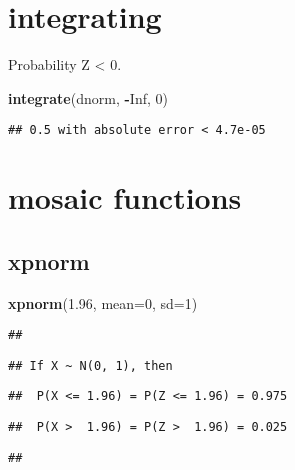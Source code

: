 \documentclass[]{article}
\newenvironment{Shaded}{\begin{snugshade}}{\end{snugshade}}
\newcommand{\KeywordTok}[1]{\textcolor[rgb]{0.13,0.29,0.53}{\textbf{#1}}}
\newcommand{\DataTypeTok}[1]{\textcolor[rgb]{0.13,0.29,0.53}{#1}}
\newcommand{\DecValTok}[1]{\textcolor[rgb]{0.00,0.00,0.81}{#1}}
\newcommand{\FloatTok}[1]{\textcolor[rgb]{0.00,0.00,0.81}{#1}}
\newcommand{\OtherTok}[1]{\textcolor[rgb]{0.56,0.35,0.01}{#1}}
\newcommand{\OperatorTok}[1]{\textcolor[rgb]{0.81,0.36,0.00}{\textbf{#1}}}
\newcommand{\NormalTok}[1]{#1}
\begin{document}
\section{integrating}\label{integrating}

Probability Z \textless{} 0.

\begin{Shaded}
\begin{Highlighting}[]
\KeywordTok{integrate}\NormalTok{(dnorm, }\OperatorTok{-}\OtherTok{Inf}\NormalTok{, }\DecValTok{0}\NormalTok{)}
\end{Highlighting}
\end{Shaded}

\begin{verbatim}
## 0.5 with absolute error < 4.7e-05
\end{verbatim}

\section{mosaic functions}\label{mosaic-functions}

\subsection{xpnorm}\label{xpnorm}

\begin{Shaded}
\begin{Highlighting}[]
\KeywordTok{xpnorm}\NormalTok{(}\FloatTok{1.96}\NormalTok{, }\DataTypeTok{mean=}\DecValTok{0}\NormalTok{, }\DataTypeTok{sd=}\DecValTok{1}\NormalTok{)}
\end{Highlighting}
\end{Shaded}

\begin{verbatim}
## 
\end{verbatim}

\begin{verbatim}
## If X ~ N(0, 1), then
\end{verbatim}

\begin{verbatim}
##  P(X <= 1.96) = P(Z <= 1.96) = 0.975
\end{verbatim}

\begin{verbatim}
##  P(X >  1.96) = P(Z >  1.96) = 0.025
\end{verbatim}

\begin{verbatim}
## 
\end{verbatim}
\end{document}
